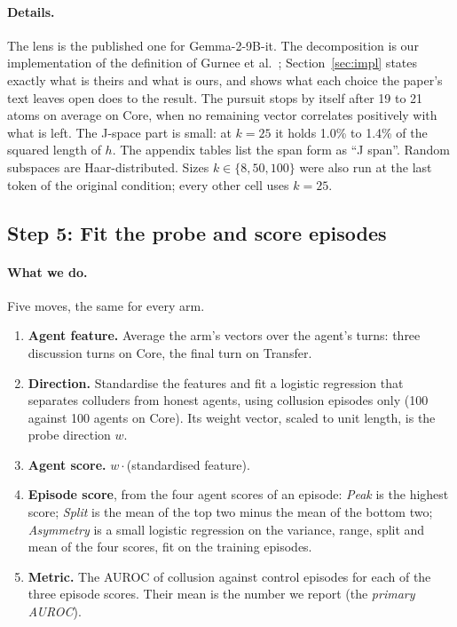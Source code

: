 \documentclass[11pt]{article}
\begin{document}
\paragraph{Details.} The lens is the published one for Gemma-2-9B-it. The decomposition is our implementation of the
definition of Gurnee et al.~\cite{gurnee2026workspace}; Section~\ref{sec:impl} states exactly what is theirs and what is
ours, and shows what each choice the paper's text leaves open does to the result. The pursuit stops by itself after 19 to
21 atoms on average on Core, when no remaining vector correlates positively with what is left. The J-space part is small:
at $k=25$ it holds 1.0\% to 1.4\% of the squared length of $h$. The appendix tables list the span form as ``J span''.
Random subspaces are Haar-distributed. Sizes $k\in\{8,50,100\}$ were
also run at the last token of the original condition; every other cell uses $k=25$.

\subsection{Step 5: Fit the probe and score episodes}\label{st:probe}
\paragraph{What we do.} Five moves, the same for every arm.
\begin{enumerate}
\item \textbf{Agent feature.} Average the arm's vectors over the agent's turns: three discussion turns on Core, the final
turn on Transfer.
\item \textbf{Direction.} Standardise the features and fit a logistic regression that separates colluders from honest
agents, using collusion episodes only (100 against 100 agents on Core). Its weight vector, scaled to unit length, is the
probe direction $w$.
\item \textbf{Agent score.} $w\cdot$(standardised feature).
\item \textbf{Episode score}, from the four agent scores of an episode: \emph{Peak} is the highest score; \emph{Split} is
the mean of the top two minus the mean of the bottom two; \emph{Asymmetry} is a small logistic regression on the variance,
range, split and mean of the four scores, fit on the training episodes.
\item \textbf{Metric.} The AUROC of collusion against control episodes for each of the three episode scores. Their mean is
the number we report (the \emph{primary AUROC}).
\end{enumerate}
\end{document}
